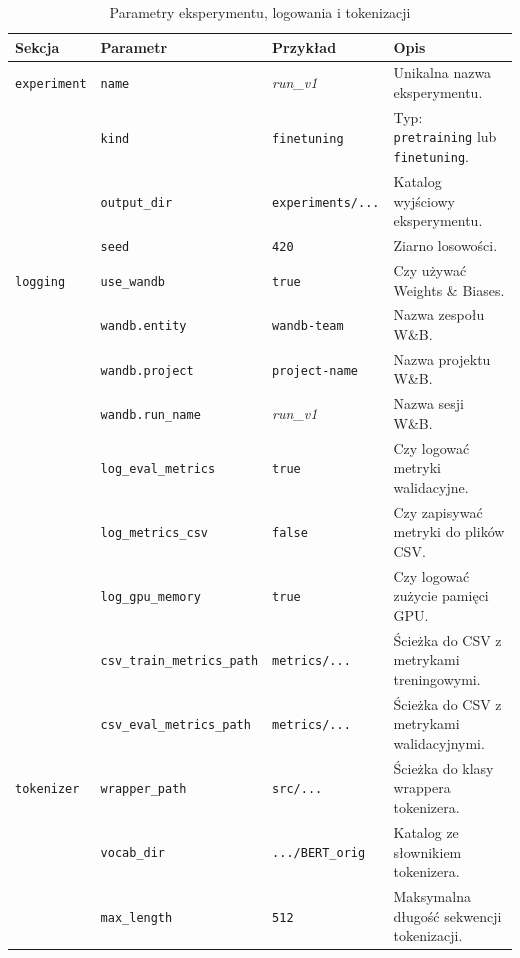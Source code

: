 \documentclass[a4paper,11pt,twoside]{report}
\theoremstyle{definition}
\begin{document}
\begin{table}[h!]
\centering
\caption{Parametry eksperymentu, logowania i tokenizacji}
\label{tab:params_general}
\small
\smallskip
\begin{tabularx}{\textwidth}{@{}lllX@{}}
\toprule
\textbf{Sekcja} & \textbf{Parametr} & \textbf{Przykład} & \textbf{Opis} \\
\midrule
\texttt{experiment} 
    & \texttt{name} & \textit{run\_v1} & Unikalna nazwa eksperymentu. \\
    & \texttt{kind} & \texttt{finetuning} & Typ: \texttt{pretraining} lub \texttt{finetuning}. \\
    & \texttt{output\_dir} & \texttt{experiments/...} & Katalog wyjściowy eksperymentu. \\
    & \texttt{seed} & \texttt{420} & Ziarno losowości. \\
\midrule
\texttt{logging} 
    & \texttt{use\_wandb} & \texttt{true} & Czy używać Weights \& Biases. \\
    & \texttt{wandb.entity} & \texttt{wandb-team} & Nazwa zespołu W\&B. \\
    & \texttt{wandb.project} & \texttt{project-name} & Nazwa projektu W\&B. \\
    & \texttt{wandb.run\_name} & \textit{run\_v1} & Nazwa sesji W\&B. \\
    & \texttt{log\_eval\_metrics} & \texttt{true} & Czy logować metryki walidacyjne. \\
    & \texttt{log\_metrics\_csv} & \texttt{false} & Czy zapisywać metryki do plików CSV. \\
    & \texttt{log\_gpu\_memory} & \texttt{true} & Czy logować zużycie pamięci GPU. \\
    & \texttt{csv\_train\_metrics\_path} & \texttt{metrics/...} & Ścieżka do CSV z metrykami treningowymi. \\
    & \texttt{csv\_eval\_metrics\_path} & \texttt{metrics/...} & Ścieżka do CSV z metrykami walidacyjnymi. \\
\midrule
\texttt{tokenizer} 
    & \texttt{wrapper\_path} & \texttt{src/...} & Ścieżka do klasy wrappera tokenizera. \\
    & \texttt{vocab\_dir} & \texttt{.../BERT\_orig} & Katalog ze słownikiem tokenizera. \\
    & \texttt{max\_length} & \texttt{512} & Maksymalna długość sekwencji tokenizacji. \\
\bottomrule
\end{tabularx}
\end{table}
\end{document}
